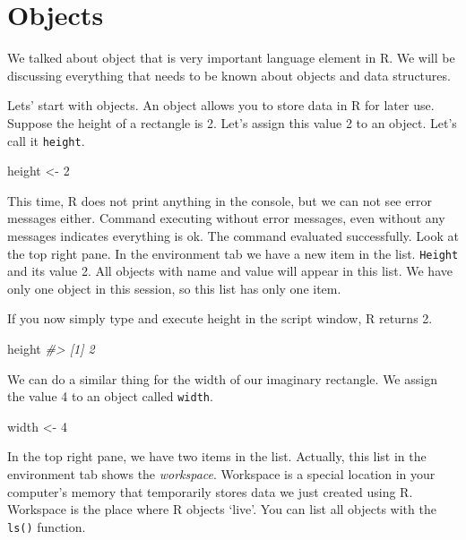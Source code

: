 \documentclass[
]{book}
\newenvironment{Shaded}{\begin{snugshade}}{\end{snugshade}}
\newcommand{\CommentTok}[1]{\textcolor[rgb]{0.56,0.35,0.01}{\textit{#1}}}
\newcommand{\DecValTok}[1]{\textcolor[rgb]{0.00,0.00,0.81}{#1}}
\newcommand{\NormalTok}[1]{#1}
\newcommand{\OtherTok}[1]{\textcolor[rgb]{0.56,0.35,0.01}{#1}}
\begin{document}
\hypertarget{objects}{%
\section{Objects}\label{objects}}

We talked about object that is very important language element in R. We will be discussing everything that needs to be known about objects and data structures.

Lets' start with objects. An object allows you to store data in R for later use. Suppose the height of a rectangle is 2. Let's assign this value 2 to an object. Let's call it \texttt{height}.

\begin{Shaded}
\begin{Highlighting}[]
\NormalTok{height }\OtherTok{\textless{}{-}} \DecValTok{2}
\end{Highlighting}
\end{Shaded}

This time, R does not print anything in the console, but we can not see error messages either. Command executing without error messages, even without any messages indicates everything is ok. The command evaluated successfully. Look at the top right pane. In the environment tab we have a new item in the list. \texttt{Height} and its value 2. All objects with name and value will appear in this list. We have only one object in this session, so this list has only one item.

If you now simply type and execute height in the script window, R returns 2.

\begin{Shaded}
\begin{Highlighting}[]
\NormalTok{height}
\CommentTok{\#\textgreater{} [1] 2}
\end{Highlighting}
\end{Shaded}

We can do a similar thing for the width of our imaginary rectangle. We assign the value 4 to an object called \texttt{width}.

\begin{Shaded}
\begin{Highlighting}[]
\NormalTok{width }\OtherTok{\textless{}{-}} \DecValTok{4}
\end{Highlighting}
\end{Shaded}

In the top right pane, we have two items in the list. Actually, this list in the environment tab shows the \emph{workspace}. Workspace is a special location in your computer's memory that temporarily stores data we just created using R.
Workspace is the place where R objects `live'. You can list all objects with the \texttt{ls()} function.
\end{document}
